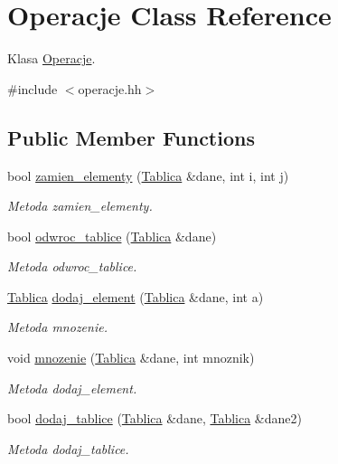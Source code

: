 \hypertarget{class_operacje}{\section{Operacje Class Reference}
\label{class_operacje}
}


Klasa \hyperlink{class_operacje}{Operacje}.  




{\ttfamily \#include $<$operacje.\-hh$>$}

\subsection*{Public Member Functions}
\begin{DoxyCompactItemize}
\item 
bool \hyperlink{class_operacje_a13a0efe72e8c8d632356b956f08916e3}{zamien\-\_\-elementy} (\hyperlink{class_tablica}{Tablica} \&dane, int i, int j)
\begin{DoxyCompactList}\small\item\em Metoda zamien\-\_\-elementy. \end{DoxyCompactList}\item 
bool \hyperlink{class_operacje_a6e8b0bb815eced17ec180aa29e19354c}{odwroc\-\_\-tablice} (\hyperlink{class_tablica}{Tablica} \&dane)
\begin{DoxyCompactList}\small\item\em Metoda odwroc\-\_\-tablice. \end{DoxyCompactList}\item 
\hyperlink{class_tablica}{Tablica} \hyperlink{class_operacje_a0f5b95f9ffa36242edca3091fb102b56}{dodaj\-\_\-element} (\hyperlink{class_tablica}{Tablica} \&dane, int a)
\begin{DoxyCompactList}\small\item\em Metoda mnozenie. \end{DoxyCompactList}\item 
void \hyperlink{class_operacje_ad1d5b407af9718dae465e4a75ba52e2c}{mnozenie} (\hyperlink{class_tablica}{Tablica} \&dane, int mnoznik)
\begin{DoxyCompactList}\small\item\em Metoda dodaj\-\_\-element. \end{DoxyCompactList}\item 
bool \hyperlink{class_operacje_acfd1e83abef061c734b7426dbcab5929}{dodaj\-\_\-tablice} (\hyperlink{class_tablica}{Tablica} \&dane, \hyperlink{class_tablica}{Tablica} \&dane2)
\begin{DoxyCompactList}\small\item\em Metoda dodaj\-\_\-tablice. \end{DoxyCompactList}\end{DoxyCompactItemize}


